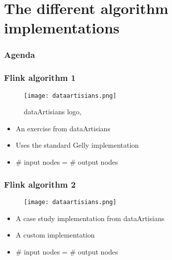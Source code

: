\section{The different algorithm implementations}

\begin{frame}
\frametitle{Agenda}
\tableofcontents[currentsection]
\end{frame}


\begin{frame}
\frametitle{Flink algorithm 1}
\begin{figure}
	
	\texttt{[image: dataartisians.png]}
	\caption{dataArtisians logo, \cite{artisians}}
\end{figure}
\begin{itemize}
\item An exercise from dataArtisians
\item Uses the standard Gelly implementation
\item \# input nodes = \# output nodes
\end{itemize}
\end{frame}

\begin{frame}
\frametitle{Flink algorithm 2}
\begin{figure}
	
	\texttt{[image: dataartisians.png]}

\end{figure}

\begin{itemize}
\item A case study implementation from dataArtisians
\item A custom implementation
\item \# input nodes = \# output nodes
\end{itemize}
\end{frame}

